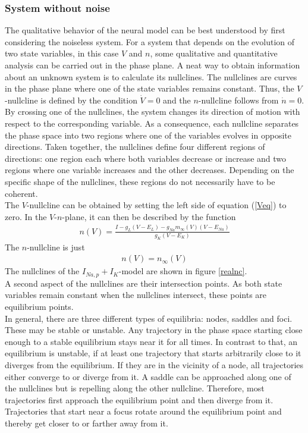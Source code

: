 \documentclass[12pt,a4paper]{article}
\begin{document}
\subsubsection{System without noise}\label{mod1won}
The qualitative behavior of the neural model can be best understood by first considering the noiseless system.
For a system that depends on the evolution of two state variables, in this case $V$ and $n$, some qualitative and quantitative analysis can be carried out in the phase plane. A neat way to obtain information about an unknown system is to calculate its nullclines. The nullclines are curves in the phase plane where one of the state variables remains constant. Thus, the $V$-nullcline is defined by the condition $\dot{V}=0$ and the $n$-nullcline follows from $\dot{n}=0$. By crossing one of the nullclines, the system changes its direction of motion with respect to the corresponding variable. As a consequence, each nullcline separates the phase space into two regions where one of the variables evolves in opposite directions. Taken together, the nullclines define four different regions of directions: one region each where both variables decrease or increase and two regions where one variable increases and the other decreases. Depending on the specific shape of the nullclines, these regions do not necessarily have to be coherent.\\
The $V$-nullcline can be obtained by setting the left side of equation (\ref{Veq}) to zero. In the $V$-$n$-plane, it can then be described by the function
\begin{align}
n(V)=\frac{I - g_L(V-E_L) - g_{Na}m_{\infty}(V)(V-E_{Na})}{g_K(V-E_K)}
\end{align} 
The $n$-nullcline is just
\begin{align}
n(V)=n_\infty(V)
\end{align}
The nullclines of the $I_{Na,p}+I_K$-model are shown in figure \ref{realnc}.\\
A second aspect of the nullclines are their intersection points. As both state variables remain constant when the nullclines intersect, these points are equilibrium points.\\
In general, there are three different types of equilibria: nodes, saddles and foci. These may be stable or unstable. Any trajectory in the phase space starting close enough to a stable equilibrium stays near it for all times. In contrast to that, an equilibrium is unstable, if at least one trajectory that starts arbitrarily close to it diverges from the equilibrium.
If they are in the vicinity of a node, all trajectories either converge to or diverge from it. A saddle can be approached along one of the nullclines but is repelling along the other nullcline. Therefore, most trajectories first approach the equilibrium point and then diverge from it. Trajectories that start near a focus rotate around the equilibrium point and thereby get closer to or farther away from it. 
\end{document}
